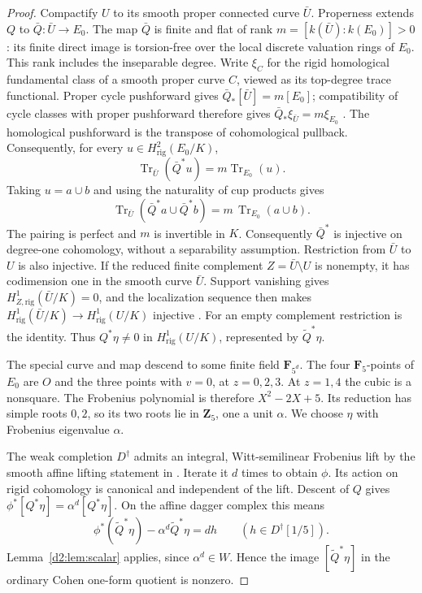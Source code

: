 \documentclass[11pt,a4paper]{amsart}
\numberwithin{equation}{section}
\theoremstyle{definition}
\theoremstyle{remark}
\newcommand{\DtwoZZ}{\mathbf{Z}}
\newcommand{\DtwoFF}{\mathbf{F}}
\newcommand{\Dtwowt}{\widetilde}
\newcommand{\Dtworig}{\mathrm{rig}}
\DeclareMathOperator{\DtwoTr}{Tr}
\begin{document}
\begin{proof}
Compactify \(U\) to its smooth proper connected curve \(\bar U\).
Properness extends \(Q\) to
\(\bar Q\colon\bar U\to E_0\).
The map \(\bar Q\) is finite and flat of rank
\(m=[k(\bar U):k(E_0)]>0\): its finite direct image is
torsion-free over the local discrete valuation rings of \(E_0\).
This rank includes the inseparable degree.
Write \(\xi_C\) for the rigid homological fundamental class of a
smooth proper curve \(C\), viewed as its top-degree trace functional.
Proper cycle pushforward gives
\(\bar Q_*[\bar U]=m[E_0]\); compatibility of cycle classes with
proper pushforward therefore gives
\(\bar Q_*\xi_{\bar U}=m\xi_{E_0}\)
\cite[Proposition~2.2, Section~2.1, and Proposition~6.4]{Petrequin2003}.
The homological pushforward is the transpose of cohomological
pullback. Consequently, for every
\(u\in H^2_{\mathrm{rig}}(E_0/K)\),
\[
 \DtwoTr_{\bar U}(\bar Q^*u)=m\DtwoTr_{E_0}(u).
\]
Taking \(u=a\cup b\) and using the naturality of cup products gives
\[
 \DtwoTr_{\bar U}(\bar Q^*a\cup\bar Q^*b)
   =m\,\DtwoTr_{E_0}(a\cup b).
\]
The pairing is perfect and \(m\) is invertible in \(K\).
Consequently \(\bar Q^*\) is injective on degree-one cohomology,
without a separability assumption.
Restriction from \(\bar U\) to \(U\) is also injective.
If the reduced finite complement \(Z=\bar U\setminus U\) is
nonempty, it has codimension one in the smooth curve \(\bar U\).
Support vanishing gives \(H^1_{Z,\Dtworig}(\bar U/K)=0\), and
the localization sequence then makes
\(H^1_\Dtworig(\bar U/K)\to H^1_\Dtworig(U/K)\) injective
\cite[Theorem~1.1, third assertion, and Proposition~1.3,
pp.~63--64]{Petrequin2003}.
For an empty complement restriction is the identity.
Thus \(Q^*\eta\ne0\) in \(H^1_\Dtworig(U/K)\), represented
by \(\Dtwowt Q^*\eta\).

The special curve and map descend to some finite field
\(\DtwoFF_{5^d}\).
The four \(\DtwoFF_5\)-points of \(E_0\) are \(O\) and the three
points with \(v=0\), at \(z=0,2,3\).
At \(z=1,4\) the cubic is a nonsquare.
The Frobenius polynomial is therefore \(X^2-2X+5\).
Its reduction has simple roots \(0,2\), so its two roots lie in
\(\DtwoZZ_5\), one a unit \(\alpha\).
We choose \(\eta\) with Frobenius eigenvalue \(\alpha\).

The weak completion \(D^\dagger\) admits an integral, Witt-semilinear
Frobenius lift by the smooth affine lifting statement in
\cite[Introduction, p.~198]{DLZ2011}.
Iterate it \(d\) times to obtain \(\phi\).
Its action on rigid cohomology is canonical and independent of the
lift.
Descent of \(Q\) gives
\(\phi^*[Q^*\eta]=\alpha^d[Q^*\eta]\).
On the affine dagger complex this means
\[
 \phi^*(\Dtwowt Q^*\eta)-\alpha^d\Dtwowt Q^*\eta=dh
 \qquad(h\in D^\dagger[1/5]).
\]
Lemma~\ref{d2:lem:scalar} applies, since \(\alpha^d\in W\).
Hence the image \([\Dtwowt Q^*\eta]\) in the ordinary Cohen one-form
quotient is nonzero.


\end{proof}
\end{document}
